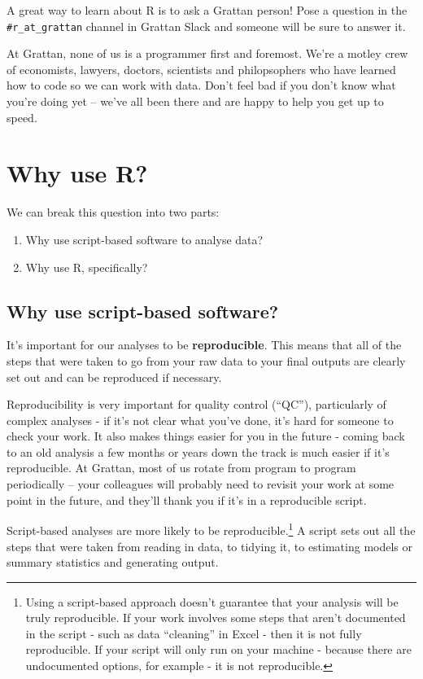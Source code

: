 \documentclass[]{book}
\providecommand{\tightlist}{%
  \setlength{\itemsep}{0pt}\setlength{\parskip}{0pt}}
\begin{document}
A great way to learn about R is to ask a Grattan person! Pose a question in the \texttt{\#r\_at\_grattan} channel in Grattan Slack and someone will be sure to answer it.

At Grattan, none of us is a programmer first and foremost. We're a motley crew of economists, lawyers, doctors, scientists and philopsophers who have learned how to code so we can work with data. Don't feel bad if you don't know what you're doing yet -- we've all been there and are happy to help you get up to speed.

\hypertarget{why-use-r}{%
\chapter{Why use R?}\label{why-use-r}}

We can break this question into two parts:

\begin{enumerate}
\def\labelenumi{\arabic{enumi}.}
\tightlist
\item
  Why use script-based software to analyse data?
\item
  Why use R, specifically?
\end{enumerate}

\hypertarget{why-script}{%
\section{Why use script-based software?}\label{why-script}}

It's important for our analyses to be \textbf{reproducible}. This means that all of the steps that were taken to go from your raw data to your final outputs are clearly set out and can be reproduced if necessary.

Reproducibility is very important for quality control (``QC''), particularly of complex analyses - if it's not clear what you've done, it's hard for someone to check your work. It also makes things easier for you in the future - coming back to an old analysis a few months or years down the track is much easier if it's reproducible. At Grattan, most of us rotate from program to program periodically -- your colleagues will probably need to revisit your work at some point in the future, and they'll thank you if it's in a reproducible script.

Script-based analyses are more likely to be reproducible.\footnote{Using a script-based approach doesn't guarantee that your analysis will be truly reproducible. If your work involves some steps that aren't documented in the script - such as data ``cleaning'' in Excel - then it is not fully reproducible. If your script will only run on your machine - because there are undocumented options, for example - it is not reproducible.} A script sets out all the steps that were taken from reading in data, to tidying it, to estimating models or summary statistics and generating output.
\end{document}
